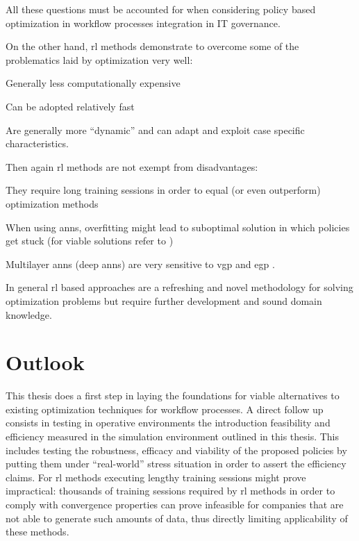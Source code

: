 All these questions must be accounted for when considering policy based optimization in workflow processes integration in IT governance.

On the other hand, \gls{rl} methods demonstrate to overcome some of the problematics laid by optimization very well:
\begin{enumerate*}
	\item Generally less computationally expensive
	\item Can be adopted relatively fast
	\item Are generally more ``dynamic'' and can adapt and exploit case specific characteristics.
\end{enumerate*}

Then again \gls{rl} methods are not exempt from disadvantages:
\begin{enumerate*}
	\item They require long training sessions in order to equal (or even outperform) optimization methods
	\item When using \glspl{ann}, overfitting might lead to suboptimal solution in which policies get stuck (for viable solutions refer to \citet{Srivastava2014})
	\item Multilayer \glspl{ann} (\ie deep \glspl{ann}) are very sensitive to \gls{vgp} and \gls{egp} \citep{Bengio1994,Pascanu2012}.
\end{enumerate*}

In general \gls{rl} based approaches are a refreshing and novel methodology for solving optimization problems but require further development and sound domain knowledge.

\section{Outlook}

This thesis does a first step in laying the foundations for viable alternatives to existing optimization techniques for workflow processes. A direct follow up consists in testing in operative environments the introduction feasibility and efficiency measured in the simulation environment outlined in this thesis. This includes testing the robustness, efficacy and viability of the proposed policies by putting them under ``real-world'' stress situation in order to assert the efficiency claims. For \gls{rl} methods executing lengthy training sessions might prove impractical: thousands of training sessions required by \gls{rl} methods in order to comply with convergence properties can prove infeasible for companies that are not able to generate such amounts of data, thus directly limiting applicability of these methods.

